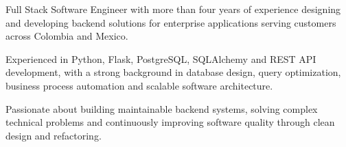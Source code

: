 
\begin{cvparagraph}
Full Stack Software Engineer with more than four years of experience designing and developing backend solutions for enterprise applications serving customers across Colombia and Mexico.

Experienced in Python, Flask, PostgreSQL, SQLAlchemy and REST API development, with a strong background in database design, query optimization, business process automation and scalable software architecture.

Passionate about building maintainable backend systems, solving complex technical problems and continuously improving software quality through clean design and refactoring.
\end{cvparagraph}